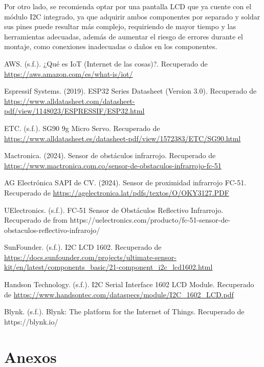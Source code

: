 \documentclass[12pt,a4paper]{article}
\begin{document}
Por otro lado, se recomienda optar por una pantalla LCD que ya cuente con el módulo I2C integrado, ya que adquirir ambos componentes por separado y soldar sus pines puede resultar más complejo, requiriendo de mayor tiempo y las herramientas adecuadas, además de aumentar el riesgo de errores durante el montaje, como conexiones inadecuadas o daños en los componentes.


\begin{thebibliography}{9}

AWS. (s.f.). ¿Qué es IoT (Internet de las cosas)?. Recuperado de \url{https://aws.amazon.com/es/what-is/iot/}

Espressif Systems. (2019). ESP32 Series Datasheet (Version 3.0). Recuperado de \url{https://www.alldatasheet.com/datasheet-pdf/view/1148023/ESPRESSIF/ESP32.html}

ETC. (s.f.). SG90 9g Micro Servo. Recuperado de \url{https://www.alldatasheet.es/datasheet-pdf/view/1572383/ETC/SG90.html}

Mactronica. (2024). Sensor de obstáculos infrarrojo. Recuperado de \url{https://www.mactronica.com.co/sensor-de-obstaculos-infrarrojo-fc-51}

AG Electrónica SAPI de CV. (2024). Sensor de proximidad infrarrojo FC-51. Recuperado de \url{https://agelectronica.lat/pdfs/textos/O/OKY3127.PDF}

 UElectronics. (s.f.). FC-51 Sensor de Obstáculos Reflectivo Infrarrojo. Recuperado de  from https://uelectronics.com/producto/fc-51-sensor-de-obstaculos-reflectivo-infrarojo/


SunFounder. (s.f.). I2C LCD 1602. Recuperado de \url{https://docs.sunfounder.com/projects/ultimate-sensor-kit/en/latest/components_basic/21-component_i2c_lcd1602.html}

Handson Technology. (s.f.). I2C Serial Interface 1602 LCD Module. Recuperado de \url{https://www.handsontec.com/dataspecs/module/I2C_1602_LCD.pdf}


 Blynk. (s.f.). Blynk: The platform for the Internet of Things. Recuperado de https://blynk.io/


\end{thebibliography}





\section{Anexos}





\end{document}

